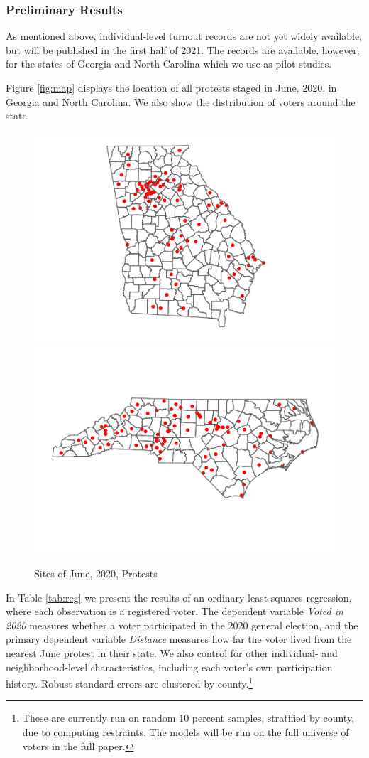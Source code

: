 \documentclass[
  12pt,
]{article}
\begin{document}
\hypertarget{preliminary-results}{%
\subsubsection*{Preliminary Results}\label{preliminary-results}}

As mentioned above, individual-level turnout records are not yet widely available, but will be published in the first half of 2021. The records are available, however, for the states of Georgia and North Carolina which we use as pilot studies.

Figure \ref{fig:map} displays the location of all protests staged in June, 2020, in Georgia and North Carolina. We also show the distribution of voters around the state.

\begin{figure}[H]
\includegraphics[width=0.5\linewidth]{asa_abstract_files/figure-latex/figures-side-1} \includegraphics[width=0.5\linewidth]{asa_abstract_files/figure-latex/figures-side-2} \caption{\label{fig:map}Sites of June, 2020, Protests}\label{fig:figures-side}
\end{figure}

In Table \ref{tab:reg} we present the results of an ordinary least-squares regression, where each observation is a registered voter. The dependent variable \emph{Voted in 2020} measures whether a voter participated in the 2020 general election, and the primary dependent variable \emph{Distance} measures how far the voter lived from the nearest June protest in their state. We also control for other individual- and neighborhood-level characteristics, including each voter's own participation history. Robust standard errors are clustered by county.\footnote{These are currently run on random 10 percent samples, stratified by county, due to computing restraints. The models will be run on the full universe of voters in the full paper.}
\end{document}

